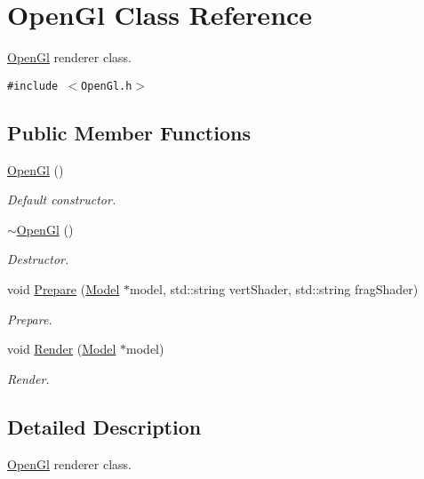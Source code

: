 \hypertarget{class_open_gl}{
\section{OpenGl Class Reference}
\label{class_open_gl}
}
\hyperlink{class_open_gl}{OpenGl} renderer class.  


{\tt \#include $<$OpenGl.h$>$}

\subsection*{Public Member Functions}
\begin{CompactItemize}
\item 
\hyperlink{class_open_gl_2daf1eb44fca97158f61ec6858cad898}{OpenGl} ()
\begin{CompactList}\small\item\em Default constructor. \item\end{CompactList}\item 
\hyperlink{class_open_gl_7c5d27fb02db6c5d7d77f8b6be2f776e}{$\sim$OpenGl} ()
\begin{CompactList}\small\item\em Destructor. \item\end{CompactList}\item 
void \hyperlink{class_open_gl_d8259307bc0b851348b7afaa46965473}{Prepare} (\hyperlink{class_model}{Model} $\ast$model, std::string vertShader, std::string fragShader)
\begin{CompactList}\small\item\em Prepare. \item\end{CompactList}\item 
void \hyperlink{class_open_gl_5ee37b305288c0640f6c370bc7fc1192}{Render} (\hyperlink{class_model}{Model} $\ast$model)
\begin{CompactList}\small\item\em Render. \item\end{CompactList}\end{CompactItemize}


\subsection{Detailed Description}
\hyperlink{class_open_gl}{OpenGl} renderer class. 

